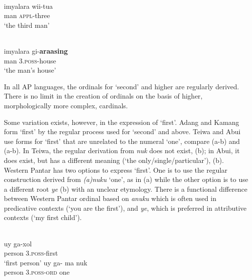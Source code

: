   

  


\ea%
\label{bkm:Ref355277550}
\\
\gll   imyalara   wii-tua\\  
   man    \textsc{appl-}three \\
\glt  `the third man'
\z

  

  




\ea%
\label{bkm:Ref342737790}
\\
\gll imyalara   gi-\textbf{araasing} \\  
    man    3.\textsc{poss}-house   \\
\glt`the man's house'
\z
 

In all AP languages, the ordinals for `second' and higher are regularly derived. There is no limit in the creation of ordinals on the basis of higher, morphologically more complex, cardinals.

Some variation exists, however, in the expression of `first'. Adang and Kamang form `first' by the regular process used for `second' and above. Teiwa and Abui use forms for `first' that are unrelated to the numeral `one', compare  (a-b) and  (a-b). In Teiwa, the regular derivation from \textit{nuk} does not exist, (b); in Abui, it does exist, but has a different meaning (`the only/single/particular'), (b). Western Pantar has two options to express `first'. One is to use the regular construction derived from \textit{(a)nuku} `one', as in (a) while the other option is to use a different root \textit{ye} (b) with an unclear etymology. There is a functional difference between Western Pantar ordinal based on \textit{anuku} which is often used in predicative contexts (`you are the first'), and \textit{ye}, which is preferred in attributive contexts (`my first child'). 


\ea%
\label{bkm:Ref342651040}
\\
\ea
\gll  uy    ga-xol \\  
     person    3\textsc{.poss}-first\\
\glt`first person'
\ex
\gll *uy    ga- ma    nuk\\
person    3\textsc{.poss-ord } one\\ 
\z\z
 


